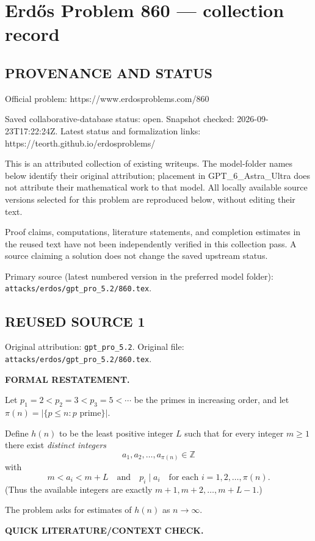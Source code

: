 \section*{Erd\H{o}s Problem 860 --- collection record}

\subsection*{PROVENANCE AND STATUS}
Official problem: https://www.erdosproblems.com/860

Saved collaborative-database status: open.
Snapshot checked: 2026-09-23T17:22:24Z.
Latest status and formalization links: https://teorth.github.io/erdosproblems/

This is an attributed collection of existing writeups. The model-folder names below identify their original attribution; placement in GPT\_6\_Astra\_Ultra does not attribute their mathematical work to that model. All locally available source versions selected for this problem are reproduced below, without editing their text.

Proof claims, computations, literature statements, and completion estimates in the reused text have not been independently verified in this collection pass. A source claiming a solution does not change the saved upstream status.

Primary source (latest numbered version in the preferred model folder): \texttt{attacks/erdos/gpt\_pro\_5.2/860.tex}.

\subsection*{REUSED SOURCE 1}
Original attribution: \texttt{gpt\_pro\_5.2}.
Original file: \texttt{attacks/erdos/gpt\_pro\_5.2/860.tex}.


\noindent\textbf{FORMAL RESTATEMENT.}

Let $p_1=2<p_2=3<p_3=5<\cdots$ be the primes in increasing order, and let $\pi(n)=|\{p\le n : p\text{ prime}\}|$.

Define $h(n)$ to be the least positive integer $L$ such that for every integer $m\ge 1$ there exist \emph{distinct integers}
\[
a_1,a_2,\dots,a_{\pi(n)}\in\mathbb Z
\]
with
\[
 m < a_i < m+L\quad\text{and}\quad p_i\mid a_i\quad\text{for each }i=1,2,\dots,\pi(n).
\]
(Thus the available integers are exactly $m+1, m+2,\dots,m+L-1$.)

The problem asks for estimates of $h(n)$ as $n\to\infty$.

\medskip
\noindent\textbf{QUICK LITERATURE/CONTEXT CHECK.}

